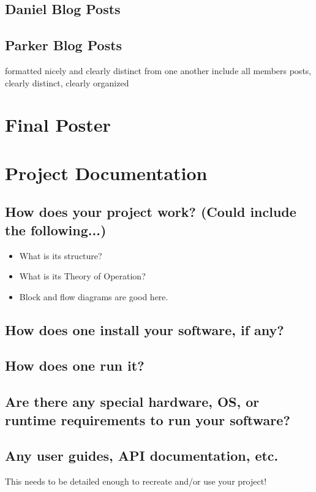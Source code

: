 \documentclass[journal,10pt,onecolumn,compsoc]{IEEEtran}
\begin{document}
    \subsection{Daniel Blog Posts}
    
	\subsection{Parker Blog Posts}
	
    formatted nicely and clearly distinct from one another
    include all members posts, clearly distinct, clearly organized
    \section{Final Poster}
    \section{Project Documentation}
    \subsection{How does your project work? (Could include the following...)}
    \begin{itemize}
    \item What is its structure?
    \item What is its Theory of Operation?
    \item Block and flow diagrams are good here.
    \end{itemize}
    \subsection{How does one install your software, if any?}
    \subsection{How does one run it?}
    \subsection{Are there any special hardware, OS, or runtime requirements to run your software?}
    \subsection{Any user guides, API documentation, etc.}
    This needs to be detailed enough to recreate and/or use your project!
\end{document}
